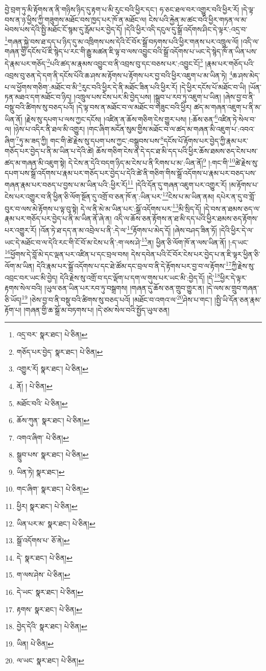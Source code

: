བྱེ་བྲག་ཏུ་མི་རྟོགས་ན་ནི་གཉིས་ཉིད་དུ་རྟག་པ་མི་རུང་བའི་ཕྱིར་དང་། ཧ་ཅང་ཐལ་བར་འགྱུར་བའི་ཕྱིར་རོ། །དེ་ལྟ་བས་ན་ཉ་ཕྱིས་ཀྱི་གཟུགས་མཐོང་བས་ཁྱད་པར་ཁོ་ན་མཐོང་ལ། ངེས་པའི་རྐྱེན་མ་ཚང་བའི་ཕྱིར་གཏན་ལ་མ་ཕེབས་པས་དེའི་སྤྱི་མཐོང་ངོ་སྙམ་དུ་རློམ་པར་བྱེད་དོ། །དེའི་ཕྱིར་འདི་དངུལ་དུ་སྒྲོ་འདོགས་ཤིང་དེ་ལྟར་:འདྲ་བ་\footnote{འདྲ་བར་  སྣར་ཐང་།  པེ་ཅིན། }གཞན་སྐྱེ་བས་ཐ་དད་པ་ཉིད་དུ་མ་འཁྲིགས་པས་དེའི་ངོ་བོར་སྒྲོ་བཏགས་པའི་ཕྱིར་གནས་པར་འཁྲུལ་ལོ། །འདི་ལ་གཞན་གྱི་དངོས་པོ་ཇི་སྙེད་པ་རང་གི་རྒྱུ་མཚན་ཇི་ལྟ་བ་ལས་འབྱུང་བའི་སྒྲོ་འདོགས་པ་ཡང་དེ་སྙེད་ཁོ་ན་ཡིན་པས་དེ་རྣམ་པར་གཅོད་\footnote{གཅོད་པར་བྱེད་  སྣར་ཐང་།  པེ་ཅིན། }པའི་ཚད་མ་རྣམས་འབྱུང་བ་ནི་འབྲས་བུ་དང་བཅས་པར་:འབྱུང་ངོ།\footnote{འགྱུར་རོ།  སྣར་ཐང་།  པེ་ཅིན། } །རྣམ་པར་གཅོད་པའི་འབྲས་བུ་ཅན་དེ་དག་ནི་དངོས་པོའི་ཆ་ཤས་མ་རྟོགས་པ་རྟོགས་པར་བྱ་བའི་ཕྱིར་འཇུག་པ་མ་ཡིན་ཏེ། \footnote{ནོ། །   པེ་ཅིན། }ཆ་ཤས་མེད་པ་ལ་ཕྱོགས་གཅིག་:མཐོང་བ་མི་\footnote{མཐོང་བའི་  པེ་ཅིན། }རུང་བའི་ཕྱིར་དེ་ནི་མཐོང་ཟིན་པའི་ཕྱིར་རོ། །དེ་ཕྱིར་དངོས་པོ་མཐོང་བ་ཡི། །ཡོན་ཏན་མཐའ་དག་མཐོང་བ་ཉིད། །འཁྲུལ་པས་ངེས་པར་མི་བྱེད་པས། །སྒྲུབ་པ་རབ་ཏུ་འཇུག་པ་ཡིན། །ཞེས་བྱ་བ་ནི་བསྡུ་བའི་ཚིགས་སུ་བཅད་པའོ། །དེ་ལྟ་བས་ན་མཐོང་བ་ལ་མཐོང་བ་གཟུང་བའི་ཕྱིར། ཚད་མ་གཞན་འཇུག་པ་ནི་མ་ཡིན་ནོ། །རྗེས་སུ་དཔག་པ་ལས་ཀྱང་དངོས། །འཛིན་ན་ཆོས་གཅིག་ངེས་གྱུར་པས། །:ཆོས་ཅན་\footnote{ཆོས་ཀུན་  སྣར་ཐང་།  པེ་ཅིན། }འཛིན་ཏེ་སེལ་བ་ལ། །ཉེས་པ་འདིར་ནི་ཐལ་མི་འགྱུར། །གང་ཞིག་མངོན་སུམ་གྱིས་མཐོང་བ་ལ་ཚད་མ་གཞན་མི་འཇུག་པ་:འབའ་ཞིག་\footnote{འགའ་ཞིག་  པེ་ཅིན། }ཏུ་མ་ཟད་ཀྱི། གང་གི་ཚེ་རྗེས་སུ་དཔག་པས་ཀྱང་:བསྒྲུབས་པས་\footnote{སྒྲུབ་པས་  སྣར་ཐང་།  པེ་ཅིན། }དངོས་པོ་རྟོགས་པར་བྱེད་ཀྱི་རྣམ་པར་གཅོད་པར་བྱེད་པ་ནི་མ་ཡིན་པ་དེའི་ཚེ། ཆོས་གཅིག་ངེས་ན་དེ་དང་ཐ་མི་དད་པའི་ཕྱིར་ཆོས་ཐམས་ཅད་ངེས་པས་ཚད་མ་གཞན་མི་འཇུག་སྟེ། དེ་ངེས་ན་དེའི་བདག་ཉིད་མ་ངེས་པ་ནི་རིགས་པ་མ་:ཡིན་ནོ།\footnote{ཡིན་ཏེ།  སྣར་ཐང་། } །:གང་གི་\footnote{གང་ཞིག་  སྣར་ཐང་།  པེ་ཅིན། }ཚེ་རྗེས་སུ་དཔག་པས་སྒྲོ་འདོགས་པ་རྣམ་པར་གཅོད་པར་བྱེད་པ་དེའི་ཚེ་ནི་གཅིག་གིས་སྒྲོ་འདོགས་པ་རྣམ་པར་བཅད་པས་གཞན་རྣམ་པར་བཅད་པ་བྱས་པ་མ་ཡིན་པའི་:ཕྱིར་རོ།\footnote{ཕྱིར།  སྣར་ཐང་།  པེ་ཅིན། } །དེའི་དོན་དུ་གཞན་འཇུག་པར་འགྱུར་རོ། །མ་རྟོགས་པ་ངེས་པར་འགྱུར་བ་ནི་ཕྱིན་ཅི་ལོག་སྔོན་དུ་འགྲོ་བ་ཅན་ཁོ་ན་:ཡིན་པར་\footnote{ཡིན་པར་མ་  སྣར་ཐང་།  པེ་ཅིན། }ངེས་པ་མ་ཡིན་ནམ། དཔེར་ན་དུ་བ་གློ་བུར་བ་ལས་མེ་རྟོགས་པ་ལྟ་བུ་སྟེ། དེ་ལ་ནི་མེ་མ་ཡིན་པར་:སྒྲོ་འདོགས་པར་\footnote{སྒྲོ་འདོགས་པ་  ཅོ་ནེ། }མི་སྲིད་དོ། །དེ་བས་ན་ཐམས་ཅད་ལ་རྣམ་པར་གཅོད་པར་བྱེད་པ་ནི་མ་ཡིན་ནོ་ཞེ་ན། འདི་ལ་ཆོས་ཅན་རྟོགས་ན་ཐ་མི་དད་པའི་ཕྱིར་ཐམས་ཅད་རྟོགས་པར་འགྱུར་རོ། །འོན་ཏེ་ཐ་དད་ན་མ་འབྲེལ་པ་ནི་:དེ་ལ་\footnote{དེ་  སྣར་ཐང་།  པེ་ཅིན། }རྟོགས་པ་མེད་དོ། །ཞེས་བཤད་ཟིན་ཏོ། །དེའི་ཕྱིར་དེ་ལ་ཡང་དེ་མཐོང་བ་ལ་དེའི་རང་གི་ངོ་བོ་མ་ངེས་པ་ནི་:ག་ལས་ཤེ་\footnote{ག་ལས་ཤེས་  པེ་ཅིན། }ན། ཕྱིན་ཅི་ལོག་ཁོ་ན་ལས་ཡིན་ནོ། །:ད་ཡང་\footnote{དེ་ཡང་  སྣར་ཐང་།  པེ་ཅིན། }ཕྱོགས་དེ་བློ་མེ་དང་ལྡན་པར་འཛིན་པ་དང་བྲལ་བས། དེས་དབེན་པའི་ངོ་བོར་ངེས་པར་བྱེད་པ་ན་ཇི་ལྟར་ཕྱིན་ཅི་ལོག་མ་ཡིན། དེའི་རྣམ་པར་སྒྲོ་འདོགས་པ་དང་ཐེ་ཚོམ་དང་བྲལ་བ་ནི་དེ་རྟོགས་པར་བྱ་བ་ལ་རྟོགས་\footnote{རྟགས་  སྣར་ཐང་།  པེ་ཅིན། }ཀྱི་རྗེས་སུ་འབྲང་བར་ཡང་མི་བྱེད། དེའི་རྗེས་སུ་འགྲོ་བ་དང་ལྡོག་པ་དག་ལ་གུས་པར་ཡང་མི་:བྱེད་དོ། །དེ་\footnote{བྱེད་དེའི་  སྣར་ཐང་།  པེ་ཅིན། }ཕྱིར་དེ་ལྟར་རྟགས་སེལ་བའི། །ཡུལ་ཅན་ཡིན་པར་རབ་ཏུ་བསྒྲགས། །གཞན་དུ་ཆོས་ཅན་གྲུབ་གྱུར་ན། །དེ་ལས་མ་གྲུབ་གཞན་ཅི་ཡོད།\footnote{ཡིན།  པེ་ཅིན། } །ཅེས་བྱ་བ་ནི་བསྡུ་བའི་ཚིགས་སུ་བཅད་པའོ། །མཐོང་བ་འགའ་ལ་\footnote{ལ་ཡང་  སྣར་ཐང་།  པེ་ཅིན། }ཤེས་པ་གང་། །སྤྱི་ཡི་དོན་ཅན་རྣམ་རྟོག་པ། །གཞན་གྱི་ཆ་སྒྲོ་མ་བཏགས་པ། །དེ་ཙམ་སེལ་བའི་སྤྱོད་ཡུལ་ཅན། 